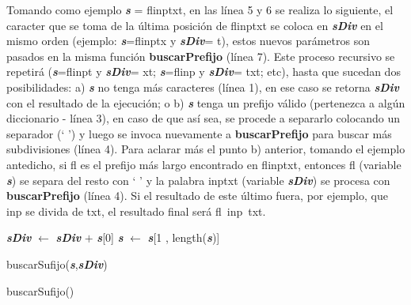Tomando como ejemplo \textit{\textbf{s}} = \textsf{flinptxt}, en las línea 5 y 6 se realiza lo siguiente, el caracter que se toma de la última posición de \textsf{flinptxt} se coloca en \textit{\textbf{sDiv}} en el mismo orden (ejemplo: \textit{\textbf{s}}=\textsf{flinptx} y \textit{\textbf{sDiv}}= \textsf{t}), estos nuevos parámetros son pasados en la misma función \textbf{buscarPrefijo} (línea 7). Este proceso recursivo se repetirá (\textit{\textbf{s}}=\textsf{flinpt} y \textit{\textbf{sDiv}}= \textsf{xt}; \textit{\textbf{s}}=\textsf{flinp} y \textit{\textbf{sDiv}}= \textsf{txt}; etc), hasta que sucedan dos posibilidades: a) \textit{\textbf{s}} no tenga más caracteres (línea 1), en ese caso se retorna \textit{\textbf{sDiv}} con el resultado de la ejecución; o b) \textit{\textbf{s}} tenga un prefijo válido (pertenezca a algún diccionario - línea 3), en caso de que así sea, se procede a separarlo colocando un separador (` ') y luego se invoca nuevamente a \mbox{\textbf{buscarPrefijo}} para buscar más subdivisiones (línea 4). Para aclarar más el punto b) anterior, tomando el ejemplo antedicho, si \textsf{fl} es el prefijo más largo encontrado en \textsf{flinptxt}, entonces \textsf{fl} (variable \textit{\textbf{s}}) se separa del resto con ` ' y la palabra \textsf{inptxt} (variable \textit{\textbf{sDiv}}) se procesa con \mbox{\textbf{buscarPrefijo}} (línea 4). Si el resultado de este último fuera, por ejemplo, que \textsf{inp} se divida de \textsf{txt}, el resultado final será \mbox{\textsf{fl inp txt}}.

\begin{function}[hb!]
\LinesNumbered%
\BlankLine

\BlankLine
{}
\BlankLine
{}

\textit{\textbf{sDiv}} $\leftarrow$ \textit{\textbf{sDiv}} $+$ \textit{\textbf{s}}[0]
\BlankLine
{}
\textit{\textbf{s}} $\leftarrow$ \textit{\textbf{s}}[1 , length(\textit{\textbf{s}})]

\Return buscarSufijo(\textit{\textbf{s}},\textit{\textbf{sDiv}})

\caption{buscarSufijo()}
\end{function}



